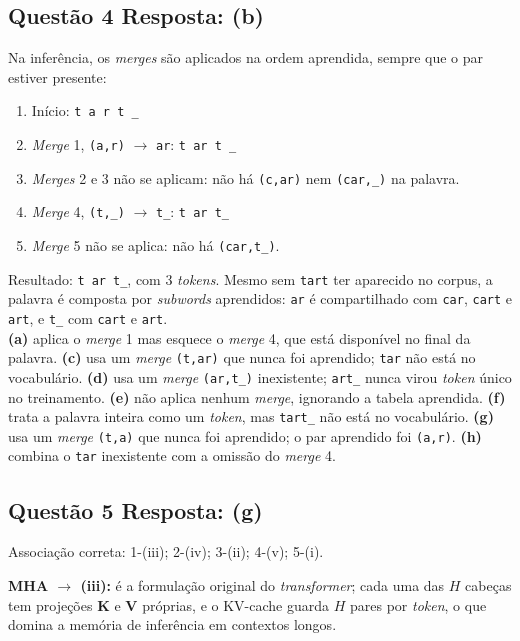 \documentclass[11pt,a4paper]{article}
\begin{document}
\subsection*{Questão 4 \textemdash{} Resposta: (b)}
Na inferência, os \textit{merges} são aplicados na ordem aprendida, sempre que o par estiver presente:
\begin{enumerate}
  \item Início: \texttt{t a r t \_}
  \item \textit{Merge} 1, \texttt{(a,r)} $\rightarrow$ \texttt{ar}: \quad \texttt{t ar t \_}
  \item \textit{Merges} 2 e 3 não se aplicam: não há \texttt{(c,ar)} nem \texttt{(car,\_)} na palavra.
  \item \textit{Merge} 4, \texttt{(t,\_)} $\rightarrow$ \texttt{t\_}: \quad \texttt{t ar t\_}
  \item \textit{Merge} 5 não se aplica: não há \texttt{(car,t\_)}.
\end{enumerate}
Resultado: \texttt{t}~\texttt{ar}~\texttt{t\_}, com 3 \textit{tokens}. Mesmo sem \texttt{tart} ter aparecido no corpus, a palavra é composta por \textit{subwords} aprendidos: \texttt{ar} é compartilhado com \texttt{car}, \texttt{cart} e \texttt{art}, e \texttt{t\_} com \texttt{cart} e \texttt{art}.\\
\textbf{(a)} aplica o \textit{merge} 1 mas esquece o \textit{merge} 4, que está disponível no final da palavra.
\textbf{(c)} usa um \textit{merge} \texttt{(t,ar)} que nunca foi aprendido; \texttt{tar} não está no vocabulário.
\textbf{(d)} usa um \textit{merge} \texttt{(ar,t\_)} inexistente; \texttt{art\_} nunca virou \textit{token} único no treinamento.
\textbf{(e)} não aplica nenhum \textit{merge}, ignorando a tabela aprendida.
\textbf{(f)} trata a palavra inteira como um \textit{token}, mas \texttt{tart\_} não está no vocabulário.
\textbf{(g)} usa um \textit{merge} \texttt{(t,a)} que nunca foi aprendido; o par aprendido foi \texttt{(a,r)}.
\textbf{(h)} combina o \texttt{tar} inexistente com a omissão do \textit{merge} 4.

\subsection*{Questão 5 \textemdash{} Resposta: (g)}
Associação correta: 1-(iii); 2-(iv); 3-(ii); 4-(v); 5-(i).

\textbf{MHA $\to$ (iii):} é a formulação original do \textit{transformer}; cada uma das $H$ cabeças tem projeções $\mathbf{K}$ e $\mathbf{V}$ próprias, e o KV-cache guarda $H$ pares por \textit{token}, o que domina a memória de inferência em contextos longos.
\end{document}
